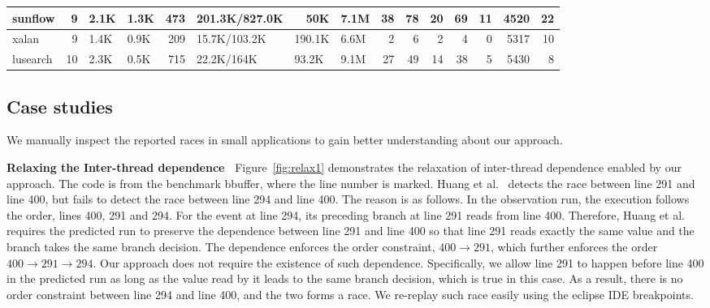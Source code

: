 \begin{table}[htbp]
\begin{flushleft}
\begin{tabular}{|l|r|r|r|r|l|r|r|r|r|r|r|r|r|r|}
sunflow & 9 & \multicolumn{1}{l|}{2.1K} & \multicolumn{1}{l|}{1.3K} & 473 & 201.3K/827.0K & 50K & \multicolumn{1}{l|}{7.1M} & 38 & 78 & 20 & 69 & 11 & 4520 & 22 \\ \hline
xalan & 9 & \multicolumn{1}{l|}{1.4K} & \multicolumn{1}{l|}{0.9K} & 209 & 15.7K/103.2K & \multicolumn{1}{l|}{190.1K} & \multicolumn{1}{l|}{6.6M} & 2 & 6 & 2 & 4 & 0 & 5317 & 10 \\ \hline
lusearch & 10 & \multicolumn{1}{l|}{2.3K} & \multicolumn{1}{l|}{0.5K} & 715 & 22.2K/164K & \multicolumn{1}{l|}{93.2K} & \multicolumn{1}{l|}{9.1M} & 27 & 49 & 14 & 38 & 5 & 5430 & 8 \\ \hline
\end{tabular}
\end{flushleft}
\label{tab:main}
\end{table}









  



\subsection{Case studies}
We manually inspect the reported races in small applications to gain better understanding about our approach. 

{\bf Relaxing the Inter-thread dependence\ } Figure~\ref{fig:relax1} demonstrates the relaxation of inter-thread dependence enabled by our approach. 
The code is from the benchmark {\sf bbuffer}, where the line number is marked. Huang et al.~\cite{} detects the race between line 291 and line 400, but fails to detect the race between line 294 and line 400. The reason is as follows. In the observation run, the execution follows the order,  lines 400, 291 and 294. For the event at line 294, its preceding branch at line 291 reads from line 400. Therefore, Huang et al.~\cite{}
 requires the predicted run to preserve the dependence between line 291 and line 400 so that line 291 reads exactly the same value and the branch takes the same branch decision. The dependence enforces the order constraint, $400 \rightarrow 291$, which further enforces the order $400\rightarrow 291 \rightarrow 294$.    Our approach does not require the existence of such dependence. Specifically, we allow line 291 to happen before line 400 in the predicted run as long as the value read by it leads to the same branch decision, which is true in this case.  As a result, there is no order constraint between line 294 and line 400, and the two forms a race. We re-replay such race  easily using the eclipse IDE breakpoints. 


